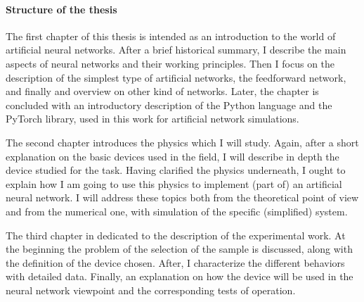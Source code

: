 \paragraph{Structure of the thesis\\}

The first chapter of this thesis is intended as an introduction to the world of artificial neural networks.
After a brief historical summary, I describe the main aspects of neural networks and their working principles.
Then I focus on the description of the simplest type of artificial networks, the feedforward network, and finally and overview on other kind of networks.
Later, the chapter is concluded with an introductory description of the Python language and the PyTorch library, used in this work for artificial network simulations.

The second chapter introduces the physics which I will study.
Again, after a short explanation on the basic devices used in the field, I will describe in depth the device studied for the task.
Having clarified the physics underneath, I ought to explain how I am going to use this physics to implement (part of) an artificial neural network.
I will address these topics both from the theoretical point of view and from the numerical one, with simulation of the specific (simplified) system.

The third chapter in dedicated to the description of the experimental work.
At the beginning the problem of the selection of the sample is discussed, along with the definition of the device chosen.
After, I characterize the different behaviors with detailed data.
Finally, an explanation on how the device will be used in the neural network viewpoint and the corresponding tests of operation.